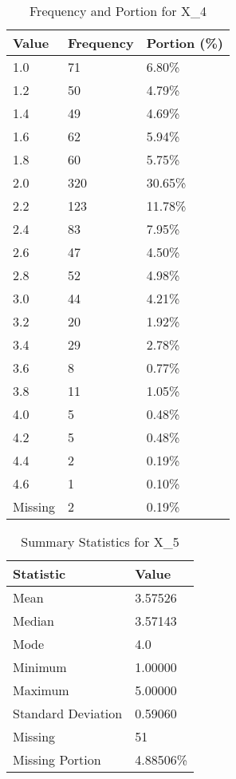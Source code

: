 \begin{table}[H]
\centering
\begin{tabular}{|l|l|l|}
\hline
\textbf{Value} & \textbf{Frequency} & \textbf{Portion (\%)} \\ \hline
1.0 & 71 & 6.80\% \\ \hline
1.2 & 50 & 4.79\% \\ \hline
1.4 & 49 & 4.69\% \\ \hline
1.6 & 62 & 5.94\% \\ \hline
1.8 & 60 & 5.75\% \\ \hline
2.0 & 320 & 30.65\% \\ \hline
2.2 & 123 & 11.78\% \\ \hline
2.4 & 83 & 7.95\% \\ \hline
2.6 & 47 & 4.50\% \\ \hline
2.8 & 52 & 4.98\% \\ \hline
3.0 & 44 & 4.21\% \\ \hline
3.2 & 20 & 1.92\% \\ \hline
3.4 & 29 & 2.78\% \\ \hline
3.6 & 8 & 0.77\% \\ \hline
3.8 & 11 & 1.05\% \\ \hline
4.0 & 5 & 0.48\% \\ \hline
4.2 & 5 & 0.48\% \\ \hline
4.4 & 2 & 0.19\% \\ \hline
4.6 & 1 & 0.10\% \\ \hline
Missing & 2 & 0.19\% \\ \hline
\end{tabular}
\caption{Frequency and Portion for X_4}
\end{table}

\begin{table}[H]
\centering
\begin{tabular}{|l|l|}
\hline
\textbf{Statistic} & \textbf{Value} \\ \hline
Mean               & 3.57526 \\ \hline
Median             & 3.57143 \\ \hline
Mode               & 4.0 \\ \hline
Minimum            & 1.00000 \\ \hline
Maximum            & 5.00000 \\ \hline
Standard Deviation & 0.59060 \\ \hline
Missing            & 51 \\ \hline
Missing Portion    & 4.88506\% \\ \hline
\end{tabular}
\caption{Summary Statistics for X_5}
\end{table}

